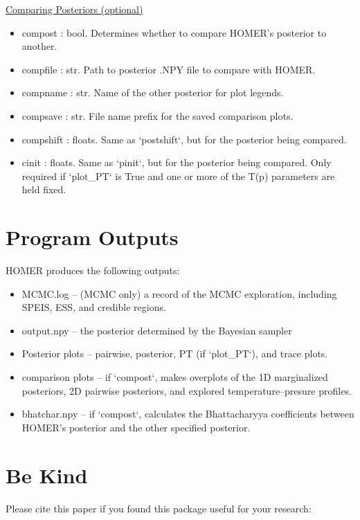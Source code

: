 \documentclass[letterpaper, 12pt]{article}
\begin{document}
\noindent \underline{Comparing Posteriors (optional)}
\begin{itemize}
\item compost     : bool. Determines whether to compare HOMER's posterior to 
                          another.
\item compfile    : str.  Path to posterior .NPY file to compare with HOMER.
\item compname    : str.  Name of the other posterior for plot legends.
\item compsave    : str.  File name prefix for the saved comparison plots.
\item compshift   : floats. Same as `postshift`, but for the posterior being 
                          compared.
\item cinit       : floats. Same as `pinit`, but for the posterior being 
                          compared.
                          Only required if `plot\_PT` is True and one or more 
                          of the T(p) parameters are held fixed.
\end{itemize}


\section{Program Outputs}
\label{sec:outputs}

HOMER produces the following outputs:

\begin{itemize}
\item MCMC.log -- (MCMC only) a record of the MCMC exploration, including SPEIS, ESS, and 
                  credible regions.
\item output.npy -- the posterior determined by the Bayesian sampler
\item Posterior plots -- pairwise, posterior, PT (if `plot\_PT`), and trace plots.
\item comparison plots -- if `compost`, makes overplots of the 1D marginalized 
                          posteriors, 2D pairwise posteriors, and explored 
                          temperature--presure profiles.
\item bhatchar.npy -- if `compost`, calculates the Bhattacharyya coefficients 
                      between HOMER's posterior and the other specified 
                      posterior.
\end{itemize}



\section{Be Kind}
\label{sec:bekind}
Please cite this paper if you found this package useful for your research:
\end{document}
